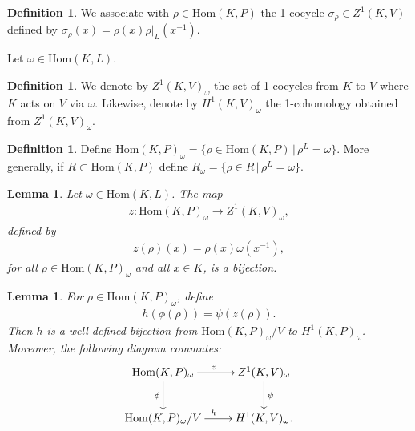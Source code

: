 \documentclass[12pt]{amsart}
\numberwithin{equation}{section}
\newtheorem{lem}[equation]{Lemma}
\theoremstyle{definition}
\newtheorem{defn}[equation]{Definition}
\theoremstyle{remark}
\theoremstyle{remark}
\begin{document}
\begin{defn} We associate with $\rho \in \mathrm{Hom}(K, P)$ 
the 1-cocycle $\sigma_\rho \in Z^1(K, V)$ defined by
$\sigma_\rho(x) = \rho(x)\rho|_L(x^{-1})$.
\end{defn}

Let $\omega \in \mathrm{Hom}(K, L)$.

\begin{defn}\label{h1sigma} We denote by
$Z^1(K, V)_\omega$
the set of 1-cocycles from $K$ to $V$ where $K$ acts on $V$ via $\omega$.
Likewise, denote by
$H^1(K, V)_\omega$
the 1-cohomology obtained from $Z^1(K, V)_\omega$.
\end{defn} 

\begin{defn} Define
$\mathrm{Hom}(K, P)_\omega = \{ \rho \in \mathrm{Hom}(K, P) \,|\, \rho^L = \omega\}$.
More generally, if $R \subset \mathrm{Hom}(K, P)$ define
$R_\omega = \{ \rho \in R \,|\, \rho^L = \omega \}$.
\end{defn}

\begin{lem}
  Let $\omega \in \mathrm{Hom}(K, L)$. The map
\begin{align*} z: \mathrm{Hom}(K, P)_{\omega} \rightarrow Z^1(K, V)_\omega, \end{align*}
defined by
\begin{align*} z(\rho)(x) = \rho(x)\omega(x^{-1}), \end{align*}
for all $\rho \in \mathrm{Hom}(K, P)_\omega$ and all $x \in K$, is a bijection.
\label{lem:hom_z1}
\end{lem}

\begin{lem} \label{maph}
For $\rho \in \mathrm{Hom}(K, P)_\omega$, define
\begin{align*}
h(\phi( \rho)) = \psi(z(\rho)).
\end{align*}
Then $h$ is a well-defined bijection from $\mathrm{Hom}(K, P)_\omega / V$ to $H^1(K, P)_\omega$. Moreover, the following diagram commutes:
  \begin{align*}
    \xymatrix{
    \mathrm{Hom}(K, P)_{\omega} \ar[r]^z \ar[d]_\phi & Z^{1}(K, V)_\omega \ar[d]^\psi \\
    \mathrm{Hom}(K, P)_{\omega}/V \ar[r]^h & H^{1}(K, V)_\omega.
    }
  \end{align*}
  \label{lem:v_h1}
\end{lem}
\end{document}
